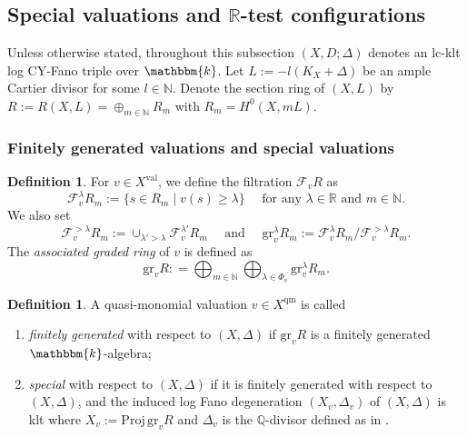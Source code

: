 \documentclass[reqno, 12pt]{amsart}
\theoremstyle{definition}
\newtheorem{defn}[prop]{Definition}
\newcommand{\bR}{\mathbb{R}}
\newcommand{\bQ}{\mathbb{Q}}
\newcommand{\bN}{\mathbb{N}}
\newcommand{\bk}{\mathbbm{k}}
\newcommand{\cF}{\mathcal{F}}
\newcommand{\gr}{\mathrm{gr}}
\newcommand{\Proj}{\mathrm{Proj}}
\newcommand{\val}{\mathrm{val}}
\newcommand{\qm}{\mathrm{qm}}
\numberwithin{equation}{section}
\begin{document}

\subsection{Special valuations and $\bR$-test configurations}

Unless otherwise stated, throughout this subsection $(X,D;\Delta)$ denotes an lc-klt log CY-Fano triple over $\bk$. Let $L:= - l (K_X+\Delta)$ be an ample Cartier divisor for some $l\in \bN$. Denote the section ring of $(X,L)$ by  $R:= R(X,L) = \oplus_{m\in\bN} R_m$ with $R_m = H^0(X, mL)$.

\subsubsection{Finitely generated valuations and special valuations}
\begin{defn}
For $v\in X^{\val}$, we define the filtration $\cF_v R$ as 
\[
\cF^{\lambda}_v R_m := \{s\in R_m \mid v(s) \geq \lambda\} \quad \textrm{ for any }\lambda\in \bR\textrm{ and }m\in \bN.
\]
We also set \[
\cF^{>\lambda}_v R_m := \cup_{\lambda'>\lambda} \cF^{\lambda'}_v R_m \quad\textrm{ and } \quad \gr_v^{\lambda} R_m := \cF^{\lambda}_v R_m/\cF^{>\lambda}_v R_m.
\]
The \emph{associated graded ring} of $v$ is defined as 
\[
\gr_v R : = \bigoplus_{m\in \bN} \bigoplus_{\lambda\in \Phi_v} \gr_v^{\lambda} R_m.
\]

\end{defn}

\begin{defn}
A quasi-monomial valuation $v\in X^{\qm}$ is called 
\begin{enumerate}
    \item \emph{finitely generated} with respect to $(X,\Delta)$ if $\gr_v R$ is a finitely generated $\bk$-algebra;
    \item \emph{special} with respect to  $(X,\Delta)$ if it is finitely generated with respect to $(X,\Delta)$, and the induced log Fano degeneration $(X_v, \Delta_v)$ of $(X,\Delta)$ is klt where $X_v:=\Proj\, \gr_v R$ and $\Delta_v$ is the $\bQ$-divisor defined as in \cite[Paragraph below Theorem 4.2]{LXZ22}.
\end{enumerate}
\end{defn}
\end{document}
